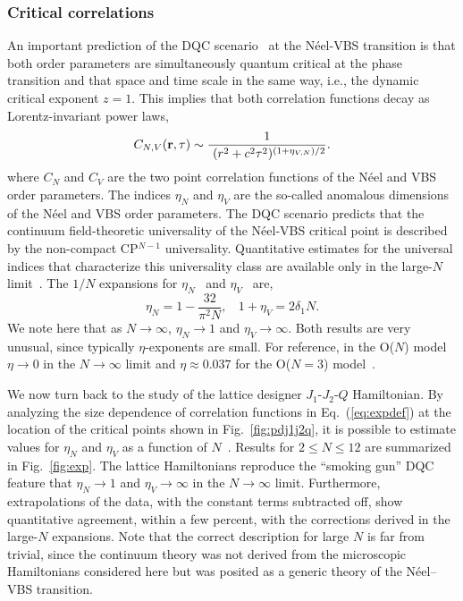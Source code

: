 \documentclass[range]{ar2e}
\begin{document}
\subsubsection{Critical correlations}

An important prediction of the DQC scenario~\cite{Senthil04a} at the N\'eel-VBS transition is that both order parameters are
simultaneously quantum critical at the phase transition and that space and time scale in the same way, i.e., the dynamic critical 
exponent $z=1$. This implies that both correlation functions decay as Lorentz-invariant power laws,
\begin{equation}
\label{eq:expdef}
C_{N,V} ({\bf r},\tau) \sim  \frac{1}{~(r^2+c^2\tau^2)^{(1+\eta_{V,N})/2}}.
\end{equation}
 where $C_N$ and $C_V$ are the two point correlation functions of the
 N\'eel and VBS order parameters. The indices $\eta_N$ and $\eta_V$
 are the so-called anomalous dimensions of the N\'eel and VBS order
 parameters. The DQC scenario predicts that
 the continuum field-theoretic universality of the N\'eel-VBS critical
 point is described by the non-compact CP$^{N-1}$ universality. Quantitative
 estimates for the universal indices that characterize this
 universality class are available only in the large-$N$
 limit~\cite{halperin1974:largeN}. The ${1}/{N}$ expansions for $\eta_N$~\cite{kaul2008:u1} and $\eta_V$~\cite{murthy1990:mono,metlitski2008:mono} are,
\begin{equation}
\label{eq:oneonN}
\eta_N = 1 - \frac{32}{\pi^2N},~~~~
1+\eta_V = 2 \delta_1 N.
\end{equation}
We note here that as $N\rightarrow\infty$, $\eta_N \rightarrow 1$ and $\eta_V\rightarrow \infty$. Both results are very unusual, since typically 
$\eta$-exponents are small. For reference, in the O($N$) model $\eta\rightarrow0$ in the $N\rightarrow\infty$ limit and $\eta \approx 0.037$ 
for the O($N=3$) model~\cite{campostrini2002:o3}.

We now turn back to the study of the lattice designer $J_1$-$J_2$-$Q$ Hamiltonian. By analyzing the size dependence of correlation 
functions in Eq.~(\ref{eq:expdef}) at the location of the critical points shown in Fig.~\ref{fig:pdj1j2q}, it is possible to
estimate values for $\eta_N$ and $\eta_V$ as a function of $N$~\cite{lou2009:sun,kaul2011:j1j2}. Results for $2\leq N \leq 12$ are 
summarized in Fig.~\ref{fig:exp}. The lattice Hamiltonians reproduce the ``smoking gun'' DQC feature that $\eta_N \to 1$ and $\eta_V \to \infty$ in 
the $N\rightarrow \infty$ limit. Furthermore, extrapolations of the data, with the constant terms subtracted off, show quantitative 
agreement, within a few percent, with the corrections derived in the large-$N$ expansions. Note that the correct description for large 
$N$ is far from trivial, since the continuum theory was not derived from the microscopic Hamiltonians considered here but was posited as a 
generic theory of the N\'eel--VBS transition. 
\end{document}
